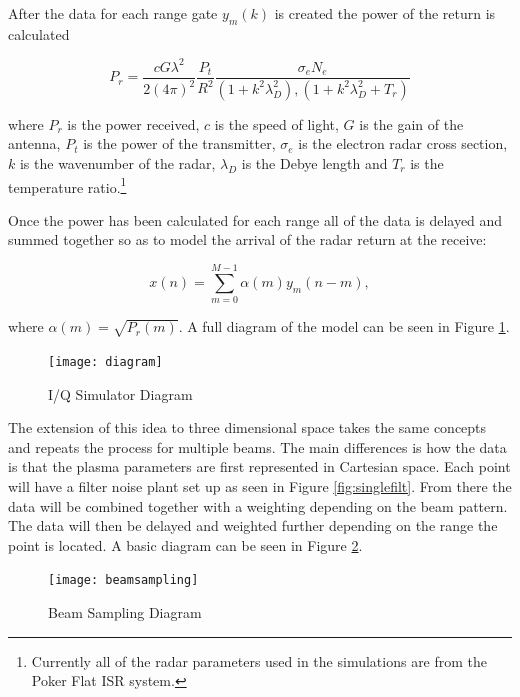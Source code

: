 \documentclass[10pt]{report}
\begin{document}
After the data for each range gate $y_m(k)$ is created the power of the return is calculated

\begin{equation}
\label{eq3}
P_r = \frac{cG \lambda^2}{2(4\pi)^2}\frac{P_t }{R^2}\frac{\sigma_e N_e}{(1+k^2\lambda_D^2),(1+k^2\lambda_D^2 + T_r)}
\end{equation}
 
 \noindent where $P_r$ is the power received, $c$ is the speed of light, $G$ is the gain of the antenna, $P_t$ is the power of the transmitter, $\sigma_e$ is the electron radar cross section, $k$ is the wavenumber of the radar, $\lambda_D$ is the Debye length and $T_r$ is the temperature ratio.\footnote{Currently all of the radar parameters used in the simulations are from the Poker Flat ISR system.}
 
Once the power has been calculated for each range all of the data is delayed and summed together so as to model the arrival of the radar return at the receive: 
 
\begin{equation}
\label{eq4}
x(n) = \displaystyle\sum\limits_{m =0}^{M-1} \alpha(m)y_m(n-m),
\end{equation}

\noindent where $\alpha(m) = \sqrt{P_r(m)}$.  A full diagram of the model can be seen in Figure \ref{fig:sumrule}.

\begin{figure}[!t]
\centering
\texttt{[image: diagram]}
\caption{I/Q Simulator Diagram}
\label{fig:sumrule}
\end{figure}

The extension of this idea to three dimensional space takes the same concepts and repeats the process for multiple beams.  The main differences is how the data is that the plasma parameters are first represented in Cartesian space.  Each point will have a filter noise plant set up as seen in Figure \ref{fig:singlefilt}.  From there the data will be combined together with a weighting depending on the beam pattern.  The data will then be delayed and weighted further depending on the range the point is located.  A basic diagram can be seen in Figure \ref{fig:beamdia}.

\begin{figure}[!t]
\centering
\texttt{[image: beamsampling]}
\caption{Beam Sampling Diagram}
\label{fig:beamdia}
\end{figure}
\end{document}
